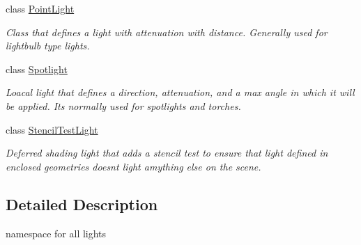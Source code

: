 \begin{DoxyCompactItemize}
class \mbox{\hyperlink{class_geometry_engine_1_1_geometry_world_item_1_1_geometry_light_1_1_point_light}{Point\+Light}}
\begin{DoxyCompactList}\small\item\em Class that defines a light with attenuation with distance. Generally used for lightbulb type lights. \end{DoxyCompactList}\item 
class \mbox{\hyperlink{class_geometry_engine_1_1_geometry_world_item_1_1_geometry_light_1_1_spotlight}{Spotlight}}
\begin{DoxyCompactList}\small\item\em Loacal light that defines a direction, attenuation, and a max angle in which it will be applied. It\textquotesingle{}s normally used for spotlights and torches. \end{DoxyCompactList}\item 
class \mbox{\hyperlink{class_geometry_engine_1_1_geometry_world_item_1_1_geometry_light_1_1_stencil_test_light}{Stencil\+Test\+Light}}
\begin{DoxyCompactList}\small\item\em Deferred shading light that adds a stencil test to ensure that light defined in enclosed geometries doesn\textquotesingle{}t light amything else on the scene. \end{DoxyCompactList}\end{DoxyCompactItemize}


\subsection{Detailed Description}
namespace for all lights 